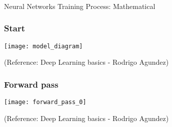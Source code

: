 

\begin{frame}[fragile]\frametitle{}
\begin{center}
{\Large Neural Networks Training Process: Mathematical}
\end{center}
\end{frame}

\begin{frame}[fragile] \frametitle{Start}

\begin{center}
\texttt{[image: model\_diagram]}

\end{center}

\tiny{(Reference: Deep Learning basics - Rodrigo Agundez)}

\end{frame}


\begin{frame}[fragile] \frametitle{Forward pass}

\begin{center}
\texttt{[image: forward\_pass\_0]}

\end{center}

\tiny{(Reference: Deep Learning basics - Rodrigo Agundez)}

\end{frame}

